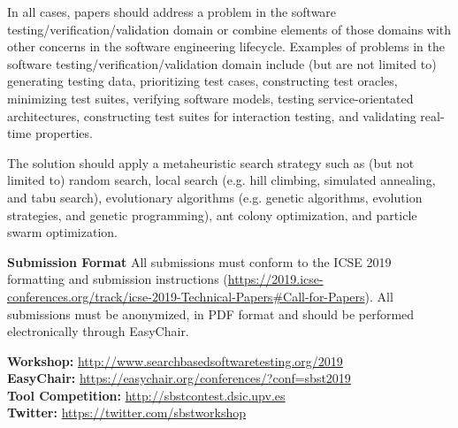 \documentclass[10pt,conference]{IEEEtran}
\begin{document}
\smallskip \noindent In all cases, papers should address a problem in
the software testing/verification/validation domain or combine
elements of those domains with other concerns in the software
engineering lifecycle. Examples of problems in the software
testing/verification/validation domain include (but are not limited
to) generating testing data, prioritizing test cases, constructing
test oracles, minimizing test suites, verifying software models,
testing service-orientated architectures, constructing test suites for
interaction testing, and validating real-time properties.

\smallskip \noindent The solution should apply a metaheuristic search
strategy such as (but not limited to) random search, local search
(e.g. hill climbing, simulated annealing, and tabu search),
evolutionary algorithms (e.g. genetic algorithms, evolution
strategies, and genetic programming), ant colony optimization, and
particle swarm optimization.

\smallskip\noindent\textbf{Submission Format}
\noindent All submissions must conform to the ICSE 2019 formatting and
submission instructions
(\url{https://2019.icse-conferences.org/track/icse-2019-Technical-Papers#Call-for-Papers}). All
submissions must be anonymized, in PDF format and should be performed
electronically through EasyChair.

\begin{center}
\textbf{Workshop:} \url{http://www.searchbasedsoftwaretesting.org/2019}\\
\textbf{EasyChair:} \url{https://easychair.org/conferences/?conf=sbst2019}\\
\textbf{Tool Competition:} \url{http://sbstcontest.dsic.upv.es}\\
\textbf{Twitter:} \url{https://twitter.com/sbstworkshop}
\end{center}

\end{document}
